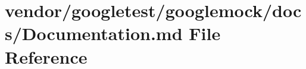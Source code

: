 \hypertarget{googlemock_2docs_2Documentation_8md}{}\section{vendor/googletest/googlemock/docs/\+Documentation.md File Reference}
\label{googlemock_2docs_2Documentation_8md}
